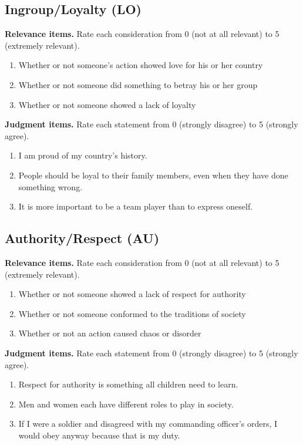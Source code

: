 \subsection*{Ingroup/Loyalty (LO)}
\textbf{Relevance items.} Rate each consideration from 0 (not at all relevant) to 5 (extremely relevant).
\begin{enumerate}
\item[LO13] Whether or not someone's action showed love for his or her country
\item[LO14] Whether or not someone did something to betray his or her group
\item[LO15] Whether or not someone showed a lack of loyalty
\end{enumerate}
\textbf{Judgment items.} Rate each statement from 0 (strongly disagree) to 5 (strongly agree).
\begin{enumerate}
\item[LO16] I am proud of my country's history.
\item[LO17] People should be loyal to their family members, even when they have done something wrong.
\item[LO18] It is more important to be a team player than to express oneself.
\end{enumerate}
\subsection*{Authority/Respect (AU)}
\textbf{Relevance items.} Rate each consideration from 0 (not at all relevant) to 5 (extremely relevant).
\begin{enumerate}
\item[AU19] Whether or not someone showed a lack of respect for authority
\item[AU20] Whether or not someone conformed to the traditions of society
\item[AU21] Whether or not an action caused chaos or disorder
\end{enumerate}
\textbf{Judgment items.} Rate each statement from 0 (strongly disagree) to 5 (strongly agree).
\begin{enumerate}
\item[AU22] Respect for authority is something all children need to learn.
\item[AU23] Men and women each have different roles to play in society.
\item[AU24] If I were a soldier and disagreed with my commanding officer's orders, I would obey anyway because that is my duty.
\end{enumerate}
